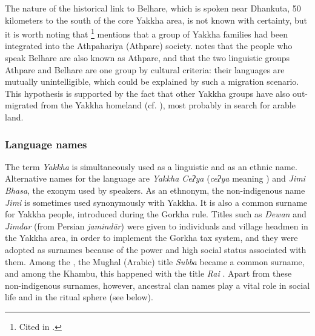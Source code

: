 The nature of the historical link to Belhare, which is spoken near Dhankuta, 50 kilometers to the  south of the core Yakkha area, is not known with certainty, but it is worth noting that \citet[13, 47]{Dahal1985An-ethnographic}\footnote{Cited in \citet[1]{Russell1992_Yakha}.} mentions that a group of Yakkha families had been integrated into the Athpahariya (Athpare) society. \citet[21]{Bickel1996Aspect} notes that the people who speak Belhare are also known as Athpare, and that the two linguistic groups Athpare and Belhare are one group  by cultural criteria: their languages are mutually unintelligible, which could be explained by such a migration scenario. This hypothesis is supported by the fact that other Yakkha groups have also out-migrated from the Yakkha homeland (cf. ), most probably in search for arable land.


\subsubsection{Language names}

The term \emph{Yakkha} is simultaneously used as a linguistic and as an ethnic name. Alternative names for the language are \emph{Yakkha Ceʔya} (\emph{ceʔya} meaning ) and \emph{Jimi Bhasa}, the exonym used by  speakers.  As an ethnonym, the non-indigenous name \emph{Jimi}  is  sometimes used synonymously with Yakkha. It is also a common surname for Yakkha people, introduced during the Gorkha rule. Titles such as \emph{Dewan} and \emph{Jimdar} (from Persian \emph{jamindār}) were given to individuals  and village headmen in the Yakkha area, in order to implement the Gorkha tax system, and they were adopted as surnames because of the power and high social status associated with them. Among the , the Mughal (Arabic) title \emph{Subba} became a common surname, and among the Khambu, this happened with the title \emph{Rai}  \citep[51]{Whelpton2005A-History}. Apart from these non-indigenous surnames, however, ancestral clan names play a vital role in social life and in the ritual sphere (see  below).  

